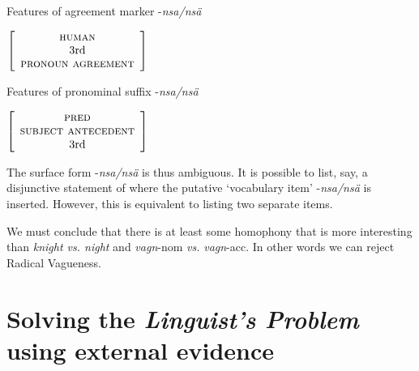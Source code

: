 \documentclass[10pt]{article}
\begin{document}
\begin{example}\label{agr}Features of agreement marker -{\it nsa/ns\"{a}}

{$\left[ \begin{array}{c}
                 \mbox{{\sc human}} \\ 
                \mbox{3rd} \\
                \mbox{\sc pronoun agreement}
                \end{array}
                \right]$}
\end{example}



\begin{example}\label{prsf}Features of pronominal suffix  -{\it nsa/ns\"{a}}

{$\left[ \begin{array}{c}
                 \mbox{{\sc pred}} \\
                 \mbox{{\sc subject antecedent}} \\ 
                \mbox{3rd} \\
                \end{array}
                \right]$}
\end{example}

\noindent The surface form -{\it nsa/ns\"{a}} is thus ambiguous. It is possible to list, say, a disjunctive statement of where the putative `vocabulary item' -{\it nsa/ns\"{a}}  is inserted. However, this is equivalent to listing two separate items.               






\begin{example}We must conclude that there is at least some homophony that is more interesting than {\it knight vs. night} and {\it vagn}-{\sc nom} {\it vs.} {\it vagn}-{\sc acc}. In other words we can reject Radical Vagueness.
\end{example}






\section{Solving the {\it Linguist's Problem} using external evidence}
\end{document}
